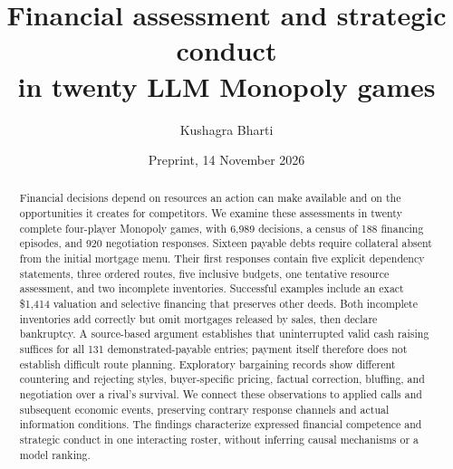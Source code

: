 \documentclass[10pt,twocolumn,letterpaper]{article}
\title{Financial assessment and strategic conduct\\in twenty LLM Monopoly games}
\author{Kushagra Bharti}
\date{Preprint, 14 November 2026}
\begin{document}
\maketitle
\begin{abstract}
Financial decisions depend on resources an action can make available and on the opportunities it creates for competitors. We examine these assessments in twenty complete four-player Monopoly games, with 6,989 decisions, a census of 188 financing episodes, and 920 negotiation responses. Sixteen payable debts require collateral absent from the initial mortgage menu. Their first responses contain five explicit dependency statements, three ordered routes, five inclusive budgets, one tentative resource assessment, and two incomplete inventories. Successful examples include an exact \$1,414 valuation and selective financing that preserves other deeds. Both incomplete inventories add correctly but omit mortgages released by sales, then declare bankruptcy. A source-based argument establishes that uninterrupted valid cash raising suffices for all 131 demonstrated-payable entries; payment itself therefore does not establish difficult route planning. Exploratory bargaining records show different countering and rejecting styles, buyer-specific pricing, factual correction, bluffing, and negotiation over a rival's survival. We connect these observations to applied calls and subsequent economic events, preserving contrary response channels and actual information conditions. The findings characterize expressed financial competence and strategic conduct in one interacting roster, without inferring causal mechanisms or a model ranking.
\end{abstract}

\clearpage


\clearpage\onecolumn\appendix

\end{document}
